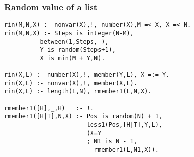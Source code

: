 \subsubsection{ Random value of a list }\begin{Verbatim}
rin(M,N,X) :- nonvar(X),!, number(X),M =< X, X =< N.
rin(M,N,X) :- Steps is integer(N-M),
	      between(1,Steps,_),
	      Y is random(Steps+1),
	      X is min(M + Y,N).

rin(X,L) :- number(X),!, member(Y,L), X =:= Y.
rin(X,L) :- nonvar(X),!, member(X,L).
rin(X,L) :- length(L,N), rmember1(L,N,X).

rmember1([H],_,H)   :- !.
rmember1([H|T],N,X) :- Pos is random(N) + 1,
                       less1(Pos,[H|T],Y,L),
                       (X=Y
                       ; N1 is N - 1,
                         rmember1(L,N1,X)).
\end{Verbatim}

